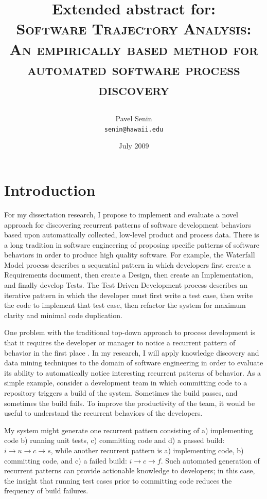 \documentclass[11pt,oneside]{article}
\begin{document}
\title{Extended abstract for: \\
       \textsc{Software Trajectory Analysis:} \\
       \textsc{An empirically based method for automated software process discovery} \\
       \author{Pavel Senin \\
         \texttt{senin@hawaii.edu}
       }
       \date{July 2009}
}
\maketitle



\section{Introduction}
For my dissertation research, I propose to implement and evaluate a novel approach for discovering recurrent patterns of software development behaviors based upon automatically collected, low-level product and process data. There is a long tradition in software engineering of proposing specific patterns of software behaviors in order to produce high quality software. For example, the Waterfall Model process describes a sequential pattern in which developers first create a Requirements document, then create a Design, then create an Implementation, and finally develop Tests. The Test Driven Development process describes an iterative pattern in which the developer must first write a test case, then write the code to implement that test case, then refactor the system for maximum clarity and minimal code duplication.

One problem with the traditional top-down approach to process development is that it requires the developer or manager to notice a recurrent pattern of behavior in the first place \cite{citeulike:5043104}. In my research, I will apply knowledge discovery and data mining techniques to the domain of software engineering in order to evaluate its ability to automatically notice interesting recurrent patterns of behavior. As a simple example, consider a development team in which committing code to a repository triggers a build of the system. Sometimes the build passes, and sometimes the build fails. To improve the productivity of the team, it would be useful to understand the recurrent behaviors of the developers. 

My system might generate one recurrent pattern consisting of a) implementing code b) running unit tests, c) committing code and d) a passed build: $i \rightarrow u \rightarrow c \rightarrow s $, while another recurrent pattern is a) implementing code, b) committing code, and c) a failed build: $i \rightarrow c \rightarrow f $. Such automated generation of recurrent patterns can provide actionable knowledge to developers; in this case, the insight that running test cases prior to committing code reduces the frequency of build failures.
\end{document}
